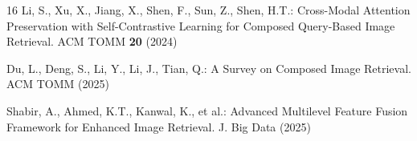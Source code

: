 \documentclass[runningheads]{llncs}
\begin{document}
\begin{thebibliography}{16}
Li, S., Xu, X., Jiang, X., Shen, F., Sun, Z., Shen, H.T.: Cross-Modal Attention Preservation with Self-Contrastive Learning for Composed Query-Based Image Retrieval. ACM TOMM \textbf{20} (2024)

Du, L., Deng, S., Li, Y., Li, J., Tian, Q.: A Survey on Composed Image Retrieval. ACM TOMM (2025)

Shabir, A., Ahmed, K.T., Kanwal, K., et al.: Advanced Multilevel Feature Fusion Framework for Enhanced Image Retrieval. J. Big Data (2025)
\end{thebibliography}
\end{document}
